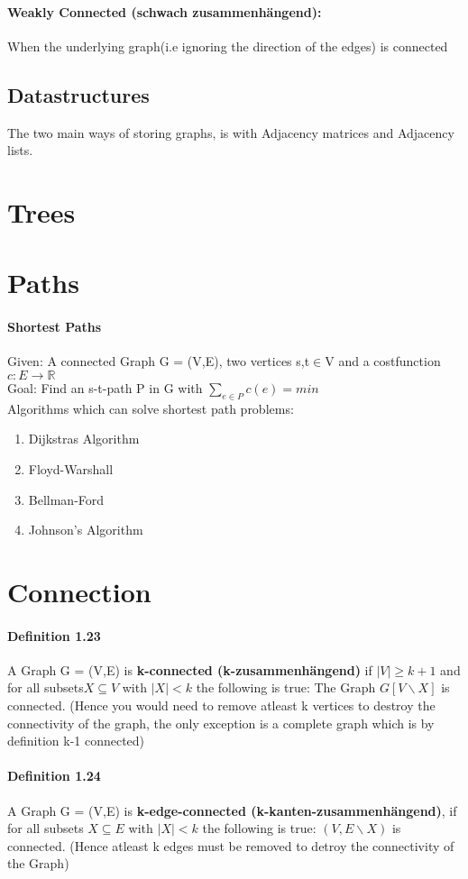 \documentclass[8pt]{extreport}
\begin{document}
\paragraph{Weakly Connected (schwach zusammenhängend):} When the underlying graph(i.e ignoring the direction of the edges) is connected
\subsection{Datastructures} The two main ways of storing graphs, is with Adjacency matrices and Adjacency lists.
\section{Trees}
\section{Paths}
\paragraph{Shortest Paths}
Given: A connected Graph G = (V,E), two vertices s,t$\in$V and a costfunction $c:E\rightarrow \mathbb{R}$\\
Goal: Find an s-t-path P in G with $\sum_{e\in P}c(e) = min$\\
Algorithms which can solve shortest path problems: 
\begin{enumerate}
\item Dijkstras Algorithm
\item Floyd-Warshall
\item Bellman-Ford
\item Johnson's Algorithm
\end{enumerate}
\section{Connection}
\paragraph{Definition 1.23} A Graph G = (V,E) is \textbf{k-connected (k-zusammenhängend)} if $|V| \geq k+1$ and for all subsets$X\subseteq V$ with $|X|<k$ the following is true: The Graph $G[V\backslash X]$ is connected. (Hence you would need to remove atleast k vertices to destroy the connectivity of the graph, the only exception is a complete graph which is by definition k-1 connected)
\paragraph{Definition 1.24} A Graph G = (V,E) is \textbf{k-edge-connected (k-kanten-zusammenhängend)}, if for all subsets $X\subseteq E$ with $|X|<k$ the following is true: $(V,E\backslash X)$ is connected. (Hence atleast k edges must be removed to detroy the connectivity of the Graph)
\end{document}
